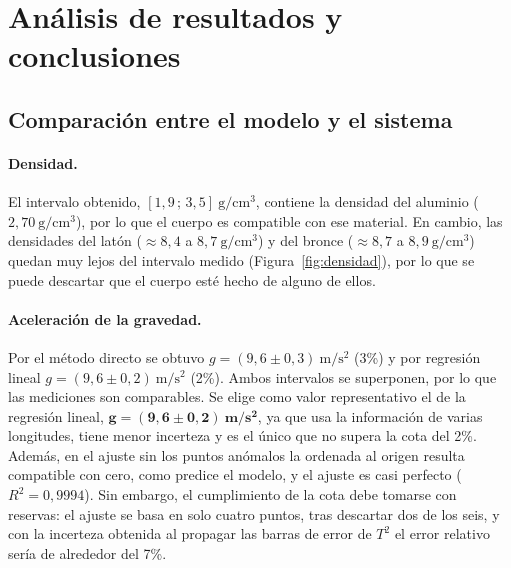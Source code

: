 \documentclass[12pt,a4paper]{article}
\begin{document}
\section{Análisis de resultados y conclusiones}

\subsection{Comparación entre el modelo y el sistema}
\paragraph{Densidad.} El intervalo obtenido, $[1{,}9\,;\,3{,}5]\ \mathrm{g/cm^3}$, contiene
la densidad del aluminio ($2{,}70\ \mathrm{g/cm^3}$), por lo que el cuerpo es compatible con
ese material. En cambio, las densidades del latón ($\approx 8{,}4$ a
$8{,}7\ \mathrm{g/cm^3}$) y del bronce ($\approx 8{,}7$ a $8{,}9\ \mathrm{g/cm^3}$) quedan muy
lejos del intervalo medido (Figura~\ref{fig:densidad}), por lo que se puede descartar que el
cuerpo esté hecho de alguno de ellos.

\paragraph{Aceleración de la gravedad.} Por el método directo se obtuvo
$g = (9{,}6 \pm 0{,}3)\ \mathrm{m/s^2}$ (3\%) y por regresión lineal
$g = (9{,}6 \pm 0{,}2)\ \mathrm{m/s^2}$ (2\%). Ambos intervalos se superponen, por lo
que las mediciones son comparables. Se elige como valor representativo el de la regresión
lineal, $\boldsymbol{g = (9{,}6 \pm 0{,}2)\ \mathbf{m/s^2}}$, ya que usa la información de
varias longitudes, tiene menor incerteza y es el único que no supera la cota del 2\%. Además,
en el ajuste sin los puntos anómalos la ordenada al origen resulta compatible con cero, como
predice el modelo, y el ajuste es casi perfecto ($R^2 = 0{,}9994$). Sin embargo, el
cumplimiento de la cota debe tomarse con reservas: el ajuste se basa en solo cuatro puntos,
tras descartar dos de los seis, y con la incerteza obtenida al propagar las barras de error
de $T^2$ el error relativo sería de alrededor del 7\%.
\end{document}
